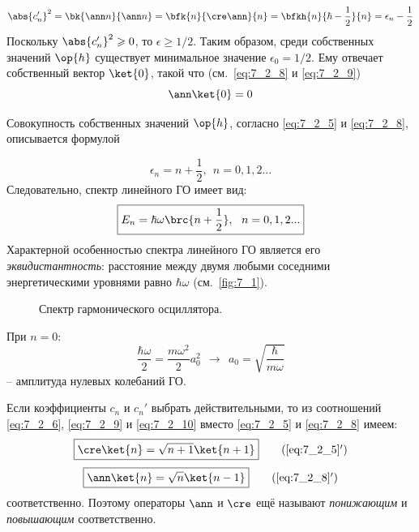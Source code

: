 \begin{equation}
\label{eq:7_2_9}
\abs{c_n'}^2 = \bk{\ann n}{\ann n} = \bfk{n}{\cre\ann}{n} = \bfkh{n}{\hbar - \frac{1}{2}}{n} = \epsilon_n - \frac{1}{2}
\end{equation}%
%
Поскольку $\abs{c_n'}^2 \geqslant 0$, то $\epsilon \geqslant 1/2$. Таким образом, среди собственных значений $\op{h}$ существует минимальное значение $\epsilon_0 = 1/2$. Ему отвечает собственный вектор $\ket{0}$, такой что (см.~\eqref{eq:7_2_8} и \eqref{eq:7_2_9})
$$
	\ann \ket{0} = 0
$$

Совокупность собственных значений $\op{h}$, согласно \eqref{eq:7_2_5} и \eqref{eq:7_2_8}, описывается формулой

\begin{equation}
\label{eq:7_2_10}
\epsilon_n = n + \frac{1}{2},~~ n = 0,1,2...
\end{equation}%
%
Следовательно, спектр линейного ГО имеет вид:
$$
\boxed {
	E_n = \hbar \omega \brc{n + \frac{1}{2}},~~ n = 0,1,2...
}
$$%
%
Характерной особенностью спектра линейного ГО является его {\em эквидистантность}: расстояние между двумя любыми соседними энергетическими уровнями равно $\hbar \omega$ (см.~\autoref{fig:7_1}).

\begin{figure}[h]
\centering
{}
\caption{Спектр гармонического осциллятора.} \label{fig:7_1}
\end{figure}

При $n = 0$:
$$
\frac{\hbar \omega}{2} = \frac{m\omega^2}{2} a_0^2  ~~\to~~
\boxed{
  a_0 = \sqrt{\frac{\hbar}{m\omega}}
}
$$
-- амплитуда нулевых колебаний ГО.

Если коэффициенты $c_n$ и $c_n'$ выбрать действительными, то из соотношений \eqref{eq:7_2_6}, \eqref{eq:7_2_9} и \eqref{eq:7_2_10} вместо \eqref{eq:7_2_5} и \eqref{eq:7_2_8} имеем:
\begin{equation}
\label{eq:7_2_5_add}
\boxed {
	\cre\ket{n} = \sqrt{n+1}\ket{n+1}
}
\tag{\ref{eq:7_2_5}$'$}
\end{equation}%
\begin{equation}
\label{eq:7_2_8_add}
\boxed {
	\ann\ket{n} = \sqrt{n}\ket{n-1}
}
\tag{\ref{eq:7_2_8}$'$}
\end{equation}%
%
соответственно. Поэтому операторы $\ann$ и $\cre$ ещё называют {\em понижающим} и {\em повышающим} соответственно.

